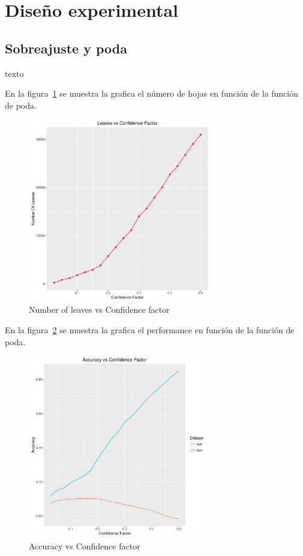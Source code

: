 \section{Diseño experimental}

\subsection{Sobreajuste y poda}


texto



En la figura~\ref{fig:3a} se muestra la grafica el número de hojas en función de la función de poda.

\begin{figure}
  \centering
  \includegraphics[width = 8cm]{3a.pdf}
  \caption{Number of leaves vs Confidence factor}
  \label{fig:3a}
\end{figure}

En la figura~\ref{fig:3b} se muestra la grafica el performance en función de la función de poda.

\begin{figure}
  \centering
  \includegraphics[width = 8cm]{3b.pdf}
  \caption{Accuracy vs Confidence factor}
  \label{fig:3b}
\end{figure}


